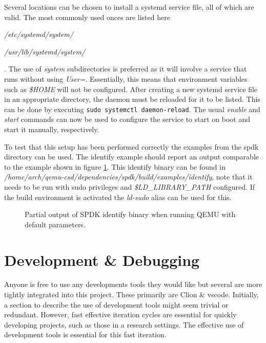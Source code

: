 \documentclass[conference]{IEEEtran}
\newcommand\bashstyle{
	\lstset{
		language=Bash,
		basicstyle=\ttm,
		showstringspaces=false,
		tabsize=2,
		aboveskip=0.2cm,
		belowskip=0.2cm,
		prebreak=\textbackslash,
		extendedchars=true,
		mathescape=false,
		linewidth=8.85cm,
		breaklines=true
	}
}
\newcommand\bashinline[1]{{\bashstyle\lstinline!#1!}}
\newcommand\bashexternal[2][]{{\bashstyle}}
\begin{document}
Several locations can be chosen to install a systemd service file, all of which
are valid. The most commonly used onces are listed here \begin{enumerate*}
\item \textit{/etc/systemd/system/} \item \textit{/usr/lib/systemd/system/}
\end{enumerate*}. The use of \textit{system} subdirectories is preferred as it
will involve a service that runs without using \textit{User=}. Essentially, this
means that environment variables such as \textit{\$HOME} will not be configured.
After creating a new systemd service file in an appropriate directory, the
daemon must be reloaded for it to be listed. This can be done by
executing\bashinline{sudo systemctl daemon-reload}. The usual \textit{enable}
and \textit{start} commands can now be used to configure the service to start
on boot and start it manually, respectively.

To test that this setup has been performed correctly the examples from the spdk
directory can be used. The identify example should report an output comparable
to the example shown in figure \ref{fig:spdk-identify}. This identify binary can
be found in
\textit{/home/arch/qemu-csd/dependencies/spdk/build/examples/identify}, note
that it needs to be run with sudo privileges and \textit{\$LD\_LIBRARY\_PATH}
configured. If the build environment is activated the \textit{ld-sudo} alias can
be used for this.

\begin{center}
	\begin{figure}[H]
		\bashexternal{resources/bash/identify-output.sh}
		\captionsetup{justification=centering}
		\caption{Partial output of SPDK identify binary when running QEMU with default
			parameters.}
		\label{fig:spdk-identify}
	\end{figure}
\end{center}

\section{Development \& Debugging}

Anyone is free to use any developments tools they would like but several are
more tightly integrated into this project. These primarily are Clion \& vscode.
Initially, a section to describe the use of development tools might seem trivial
or redundant. However, fast effective iteration cycles are essential for quickly
developing projects, such as those in a research settings. The effective use of
development tools is essential for this fast iteration.
\end{document}
